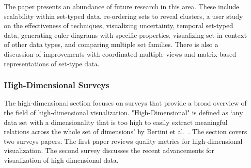 
The paper presents an abundance of future research in this area. These include scalability within set-typed data, re-ordering sets to reveal clusters, a user study on the effectiveness of techniques, visualizing uncertainty, temporal set-typed data, generating euler diagrams with specific properties, visualizing set in context of other data types, and comparing multiple set families. There is also a discussion of improvements with coordinated multiple views and matrix-based representations of set-type data.


\subsubsection{High-Dimensional Surveys}
The high-dimensional section focuses on surveys that provide a broad overview of the field of high-dimensional visualization. "High-Dimensional" is defined as `any data set with a dimensionality that is too high to easily extract meaningful relations across the whole set of dimensions' by Bertini et al.\ \cite{bertini2011quality}. The section covers two surveys papers. The first paper reviews quality metrics for high-dimensional visualization. The second survey discusses the recent advancements for visualization of high-dimensional data.

